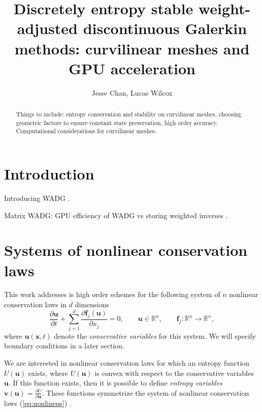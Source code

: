 \documentclass[preprint,10pt]{article}
\date{}
\author{Jesse Chan, Lucas Wilcox}
\title{Discretely entropy stable weight-adjusted discontinuous Galerkin methods: curvilinear meshes and GPU acceleration}
\theoremstyle{definition}
\theoremstyle{lemma}
\theoremstyle{theorem}
\theoremstyle{assumption}
\newcommand{\pd}[2]{\frac{\partial#1}{\partial#2}}
\begin{document}
\maketitle

\begin{abstract}
Things to include: entropy conservation and stability on curvilinear meshes, choosing geometric factors to ensure constant state preservation, high order accuracy.  Computational considerations for curvilinear meshes.  
\end{abstract}

\tableofcontents

\section{Introduction}

Introducing WADG \cite{chan2016weight1,chan2016weight2}.  

Matrix WADG: GPU efficiency of WADG vs storing weighted inverses \cite{chan2017weight}.  

\section{Systems of nonlinear conservation laws}

This work addresses is high order schemes for the following system of $n$ nonlinear conservation laws in $d$ dimensions 
\begin{equation}
\pd{\bm{u}}{t} + \sum_{j=1}^d\pd{\bm{f}_j(\bm{u})}{x_j}  = 0, \qquad \bm{u} \in \mathbb{R}^n, \qquad \bm{f}_j : \mathbb{R}^n\rightarrow \mathbb{R}^n,
\label{eq:nonlineqs}
\end{equation}
where $\bm{u}(\bm{x},t)$ denote the \emph{conservative variables} for this system.  We will specify boundary conditions in a later section.  

We are interested in nonlinear conservation laws for which an entropy function $U(\bm{u})$ exists, where $U(\bm{u})$ is convex with respect to the conservative variables $\bm{u}$.  If this function exists, then it is possible to define \emph{entropy variables} $\bm{v}(\bm{u}) = \pd{U}{\bm{u}}$.  These functions symmetrize the system of nonlinear conservation laws (\ref{eq:nonlineqs}) \cite{hughes1986new}.  
\end{document}
